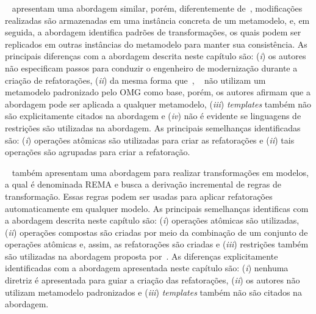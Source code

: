 ~ apresentam uma abordagem similar, porém, diferentemente de~, modificações realizadas são armazenadas em uma instância concreta de um metamodelo, e, em seguida, a abordagem identifica padrões de transformações, os quais podem ser replicados em outras instâncias do metamodelo para manter sua consistência. As principais diferenças com a abordagem descrita neste capítulo são: (\textit{i}) os autores não especificam passos para conduzir o engenheiro de modernização durante a criação de refatorações, (\textit{ii}) da mesma forma que~, ~ não utilizam um metamodelo padronizado pelo OMG como base, porém, os autores afirmam que a abordagem pode ser aplicada a qualquer metamodelo, (\textit{iii}) \textit{templates} também não são explicitamente citados na abordagem e (\textit{iv}) não é evidente se linguagens de restrições são utilizadas na abordagem. As principais semelhanças identificadas são: (\textit{i}) operações atômicas são utilizadas para criar as refatorações e (\textit{ii}) tais operações são agrupadas para criar a refatoração.  



~ também apresentam uma abordagem para realizar transformações em modelos, a qual é denominada REMA e busca a derivação incremental de regras de transformação. Essas regras podem ser usadas para aplicar refatorações automaticamente em qualquer modelo. As principais semelhanças identificas com a abordagem descrita neste capítulo são: (\textit{i}) operações atômicas são utilizadas, (\textit{ii}) operações compostas são criadas por meio da combinação de um conjunto de operações atômicas e, assim, as refatorações são criadas e (\textit{iii}) restrições também são utilizadas na abordagem proposta por~. As diferenças explicitamente identificadas com a abordagem apresentada neste capítulo são: (\textit{i}) nenhuma diretriz é apresentada para guiar a criação das refatorações, (\textit{ii}) os autores não utilizam metamodelo padronizados e (\textit{iii}) \textit{templates} também não são citados na abordagem.   


